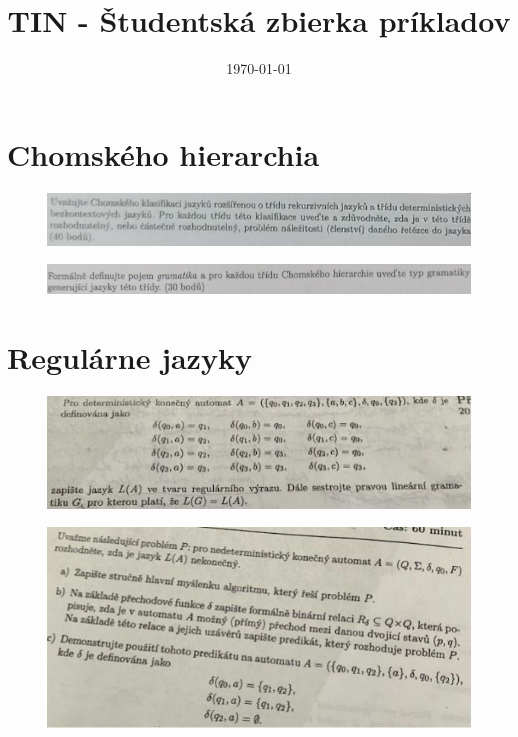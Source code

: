 \documentclass[]{article}
\begin{document}
	
	
	\title{TIN - Študentská zbierka príkladov}
	\date{\today}
	
	\maketitle
	\newpage
	\tableofcontents
	\newpage
	
	\section{Chomského hierarchia}
	
	\begin{figure}[H]
		\includegraphics[width=\textwidth]{tasks/chomsky/task1.png}
	\end{figure}
	
	\begin{figure}[H]
		\includegraphics[width=\textwidth]{tasks/chomsky/task2.png}
	\end{figure}

	\section{Regulárne jazyky}
	
	\begin{figure}[H]
		\includegraphics[width=\textwidth]{tasks/regularne/task1.png}
	\end{figure}
	
	\begin{figure}[H]
		\includegraphics[width=\textwidth]{tasks/regularne/task2.png}
	\end{figure}
	
\end{document}
